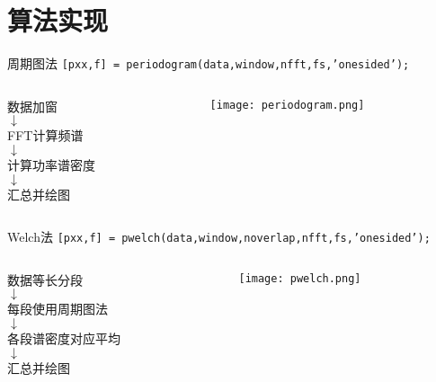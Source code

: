 \documentclass{beamer}
\begin{document}
\section{算法实现}
\begin{frame}{周期图法}
    \small
    \texttt{[pxx,f] = periodogram(data,window,nfft,fs,'onesided');}
    \vspace{\fill}
    \begin{columns}
        \begin{column}{0.4\textwidth}
            \centering
            数据加窗 \\
            $\downarrow$ \\
            FFT计算频谱 \\
            $\downarrow$ \\
            计算功率谱密度 \\
            $\downarrow$ \\
            汇总并绘图
        \end{column}
        \begin{column}{0.6\textwidth}
            \centering
            \texttt{[image: periodogram.png]}
        \end{column}
    \end{columns}
\end{frame}

\begin{frame}{Welch法}
    \small
    \texttt{[pxx,f] = pwelch(data,window,noverlap,nfft,fs,'onesided');}
    \vspace{\fill}
    \begin{columns}
        \begin{column}{0.4\textwidth}
            \centering
            数据等长分段 \\
            $\downarrow$ \\
            每段使用周期图法 \\
            $\downarrow$ \\
            各段谱密度对应平均 \\
            $\downarrow$ \\
            汇总并绘图
        \end{column}
        \begin{column}{0.6\textwidth}
            \centering
            \texttt{[image: pwelch.png]}
        \end{column}
    \end{columns}
\end{frame}
\end{document}
